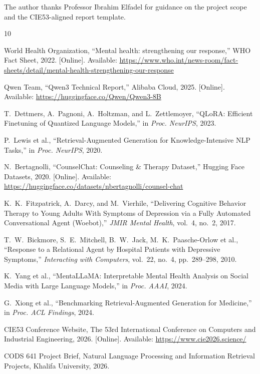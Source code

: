 \documentclass[conference]{IEEEtran}
\begin{document}
The author thanks Professor Ibrahim Elfadel for guidance on the project scope and the CIE53-aligned report template.

\begin{thebibliography}{10}

World Health Organization, ``Mental health: strengthening our response,'' WHO Fact Sheet, 2022. [Online]. Available: \url{https://www.who.int/news-room/fact-sheets/detail/mental-health-strengthening-our-response}

Qwen Team, ``Qwen3 Technical Report,'' Alibaba Cloud, 2025. [Online]. Available: \url{https://huggingface.co/Qwen/Qwen3-8B}

T.~Dettmers, A.~Pagnoni, A.~Holtzman, and L.~Zettlemoyer, ``QLoRA: Efficient Finetuning of Quantized Language Models,'' in \textit{Proc. NeurIPS}, 2023.

P.~Lewis et al., ``Retrieval-Augmented Generation for Knowledge-Intensive NLP Tasks,'' in \textit{Proc. NeurIPS}, 2020.

N.~Bertagnolli, ``CounselChat: Counseling \& Therapy Dataset,'' Hugging Face Datasets, 2020. [Online]. Available: \url{https://huggingface.co/datasets/nbertagnolli/counsel-chat}

K.~K.~Fitzpatrick, A.~Darcy, and M.~Vierhile, ``Delivering Cognitive Behavior Therapy to Young Adults With Symptoms of Depression via a Fully Automated Conversational Agent (Woebot),'' \textit{JMIR Mental Health}, vol.~4, no.~2, 2017.

T.~W.~Bickmore, S.~E.~Mitchell, B.~W.~Jack, M.~K.~Paasche-Orlow et al., ``Response to a Relational Agent by Hospital Patients with Depressive Symptoms,'' \textit{Interacting with Computers}, vol.~22, no.~4, pp.~289--298, 2010.

K.~Yang et al., ``MentaLLaMA: Interpretable Mental Health Analysis on Social Media with Large Language Models,'' in \textit{Proc. AAAI}, 2024.

G.~Xiong et al., ``Benchmarking Retrieval-Augmented Generation for Medicine,'' in \textit{Proc. ACL Findings}, 2024.

CIE53 Conference Website, The 53rd International Conference on Computers and Industrial Engineering, 2026. [Online]. Available: \url{https://www.cie2026.science/}

CODS 641 Project Brief, Natural Language Processing and Information Retrieval Projects, Khalifa University, 2026.

\end{thebibliography}
\end{document}
